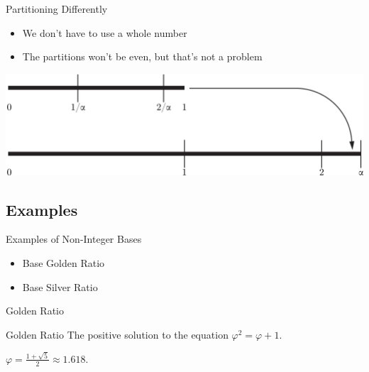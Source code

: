 \documentclass{beamer}
\begin{document}
\begin{frame}{Partitioning Differently}
  \addtocounter{framenumber}{-1}
  \begin{itemize}
    \item We don't have to use a whole number
    \item The partitions won't be even, but that's not a problem
  \end{itemize}
  \includegraphics[width=\textwidth]{images/partitioning/partitioningalpha}
\end{frame}















\subsection{Examples}
\begin{frame}{Examples of Non-Integer Bases}
  \begin{itemize}
    \item Base Golden Ratio
    \item Base Silver Ratio
  \end{itemize}
\end{frame}

\begin{frame}{Golden Ratio}
  \begin{block}{Golden Ratio}
    The positive solution to the equation $\varphi^2 = \varphi + 1$.

    $\varphi = \frac{1+\sqrt{5}}{2} \approx 1.618$.
  \end{block}
\end{frame}
\end{document}
